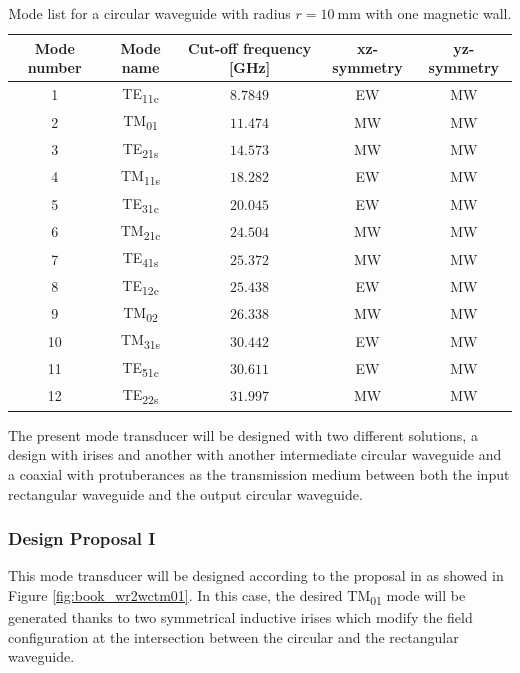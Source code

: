 \documentclass[english,twoside]{article}
\begin{document}
		\begin{table}[H]
			\centering		
			\caption{Mode list for a circular waveguide with radius $r=\SI{10}{\milli\meter}$ with one magnetic wall.}
			\begin{tabular}{c|c|c|c|c}
				Mode number & Mode name & Cut-off frequency [GHz] & xz-symmetry & yz-symmetry\\
				\hline
				1 & TE\textsubscript{11c} & $\num{8.7849}$ & EW & MW\\
				2 & TM\textsubscript{01} & $\num{11.474}$ & MW & MW\\
				3 & TE\textsubscript{21s} & $\num{14.573}$ & MW & MW\\
				4 & TM\textsubscript{11s} & $\num{18.282}$ & EW & MW\\
				5 & TE\textsubscript{31c} & $\num{20.045}$ & EW & MW\\
				6 & TM\textsubscript{21c} & $\num{24.504}$ & MW & MW\\
				7 & TE\textsubscript{41s} & $\num{25.372}$ & MW & MW\\
				8 & TE\textsubscript{12c} & $\num{25.438}$ & EW & MW\\
				9 & TM\textsubscript{02} & $\num{26.338}$ & MW & MW\\
				10 & TM\textsubscript{31s} & $\num{30.442}$ & EW & MW\\
				11 & TE\textsubscript{51c} & $\num{30.611}$ & EW & MW\\
				12 & TE\textsubscript{22s} & $\num{31.997}$ & MW & MW		
			\end{tabular}
			\label{table:wc20_xm}
		\end{table}
	
		The present mode transducer will be designed with two different solutions, a design with irises and another with another intermediate circular waveguide and a coaxial with protuberances as the transmission medium between both the input rectangular waveguide and the output circular waveguide.
		
	\subsubsection{Design Proposal I}
		This mode transducer will be designed according to the proposal in \cite{montgomery} as showed in Figure \ref{fig:book_wr2wctm01}. In this case, the desired \ac{TM}\textsubscript{01} mode will be generated thanks to two symmetrical inductive irises which modify the field configuration at the intersection between the circular and the rectangular waveguide.\\
    
\end{document}
